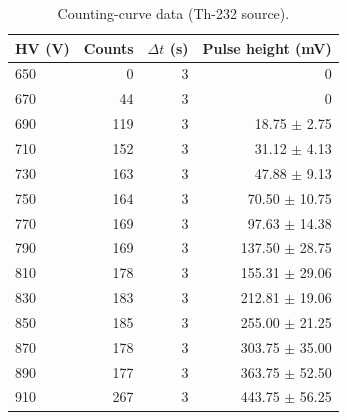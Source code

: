 \begin{table}[htbp]
\centering
\caption{Counting-curve data (Th-232 source).}
\label{tab:counting-raw}
\begin{tabular}{lrrr}
\toprule
HV (V) & Counts & $\Delta t$ (s) & Pulse height (mV) \\
\midrule
650 & 0 & 3 & 0 \\
670 & 44 & 3 & 0 \\
690 & 119 & 3 & 18.75 $\pm$ 2.75 \\
710 & 152 & 3 & 31.12 $\pm$ 4.13 \\
730 & 163 & 3 & 47.88 $\pm$ 9.13 \\
750 & 164 & 3 & 70.50 $\pm$ 10.75 \\
770 & 169 & 3 & 97.63 $\pm$ 14.38 \\
790 & 169 & 3 & 137.50 $\pm$ 28.75 \\
810 & 178 & 3 & 155.31 $\pm$ 29.06 \\
830 & 183 & 3 & 212.81 $\pm$ 19.06 \\
850 & 185 & 3 & 255.00 $\pm$ 21.25 \\
870 & 178 & 3 & 303.75 $\pm$ 35.00 \\
890 & 177 & 3 & 363.75 $\pm$ 52.50 \\
910 & 267 & 3 & 443.75 $\pm$ 56.25 \\
\bottomrule
\end{tabular}
\end{table}
